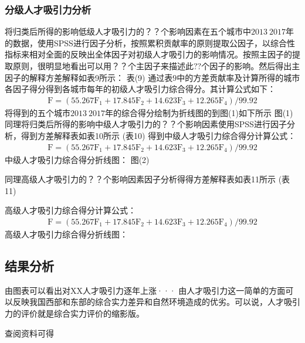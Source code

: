 \documentclass{whutmod}
\begin{document}
	\subsubsection{分级人才吸引力分析}
	将归类后所得的影响低级人才吸引力的$？？$个影响因素在五个城市中$2013~2017$年的数据，使用SPSS进行因子分析，按照累积贡献率的原则提取公因子，以综合性指标来相对全面的反映出全体因子对初级人才吸引力的影响情况。按照主因子的提取原则，很明显地看出可以用$？？$个主因子来描述此$??$个因子的影响。然后得出主因子的解释方差解释如表9所示：
	表(9)
	通过表$9$中的方差贡献率及计算所得的城市各因子得分得到各城市每年的初级人才吸引力综合得分。其计算公式如下：
	\begin{gather}
	\mathrm { F } = \left( 55.267 \mathrm { F } _ { 1 } + 17.845 \mathrm { F } _ { 2 } + 14.623 \mathrm { F } _ { 3 } + 12.265 \mathrm { F } _ { 4 } \right) / 99.92
	\end{gather}
	将得到的五个城市$2013~2017$年的综合得分绘制为折线图的到图(1)如下所示
	图(1)
	同理将归类后所得的影响中级人才吸引力的$？？$个影响因素使用SPSS进行因子分析，得到方差解释表如表10所示
	(表10)
	得到中级人才吸引力综合得分计算公式：
	\begin{gather}
	\mathrm { F } = \left( 55.267 \mathrm { F } _ { 1 } + 17.845 \mathrm { F } _ { 2 } + 14.623 \mathrm { F } _ { 3 } + 12.265 \mathrm { F } _ { 4 } \right) / 99.92
	\end{gather}
	中级人才吸引力综合得分折线图：
	图(2)
	
	同理高级人才吸引力的$？？$个影响因素因子分析得得方差解释表如表11所示
	(表11)
	
	高级人才吸引力综合得分计算公式：
	\begin{gather}
	\mathrm { F } = \left( 55.267 \mathrm { F } _ { 1 } + 17.845 \mathrm { F } _ { 2 } + 14.623 \mathrm { F } _ { 3 } + 12.265 \mathrm { F } _ { 4 } \right) / 99.92
	\end{gather}
	高级人才吸引力综合得分折线图：
	\subsection{结果分析}
	由图表可以看出对XX人才吸引力逐年上涨···
	由人才吸引力这一简单的方面可以反映我国西部和东部的综合实力差异和自然环境造成的优劣。可以说，人才吸引力的评价就是综合实力评价的缩影版。



	查阅资料可得\parencite{宋鸿2010城市人才吸引力的影响因素及提升对策}
	
\end{document}
